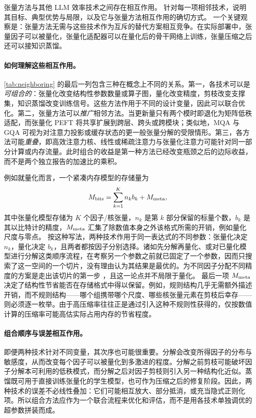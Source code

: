 \documentclass[11pt]{article}
\begin{document}
张量方法与其他 LLM 效率技术之间存在相互作用。 针对每一项相邻技术，说明其目标、典型优势与局限，以及它与张量方法相互作用的确切方式。
一个关键观察是：张量方法无需与这些技术作为互斥的替代方案相互竞争。在实际部署中，张量因子可以被量化，张量化适配器可以在量化后的骨干网络上训练，张量压缩之后还可以接知识蒸馏。

\paragraph{如何理解这些相互作用。}
\cref{tab:neighboring} 的最后一列包含三种在概念上不同的关系。第一，各技术可以是\emph{可组合的}：张量化改变结构性参数数量或算子图，量化改变精度，剪枝改变支撑集，知识蒸馏改变训练信号。这些方法作用于不同的设计变量，因此可以联合优化。第二，张量方法可以\emph{推广}相邻方法。当更新量只有两个模时即退化为矩阵低秩适配，而张量化 PEFT 将共享扩展到跨层、跨头或跨模块；类似地，MQA 与 GQA 可视为对注意力投影或缓存状态的更一般张量分解的受限情形。第三，各方法可能\emph{重叠}，即高效注意力核、线性或稀疏注意力与张量化注意力可能针对同一部分计算或内存流量。此时组合的收益是第一种方法已经改变瓶颈之后的边际收益，而不是两个独立报告的加速比的乘积。

例如就量化而言，一个紧凑内存模型的存储量为
\begin{equation}
\label{eq:memory-budget}
M_{\rm bits} = \sum_{k=1}^{K} n_k b_k + M_{\rm meta},
\end{equation}
其中张量化模型存储为 $K$ 个因子/核张量，$n_k$ 是第 $k$ 部分保留的标量个数，$b_k$ 是其以比特计的精度，$M_{\rm meta}$ 汇集了除数值本身之外该格式所需的开销，例如量化尺度与零点。
按这种写法，两种技术作用于同一表达式的不同参数：张量化决定 $n_k$，量化决定 $b_k$，且两者都按因子分别选择。诸如先分解再量化、或对已量化模型进行分解这类顺序流程，在考察另一个参数之前就已固定了一个参数，因而只搜索了这一空间的一个切片，没有理由认为其结果是最优的。为不同因子分配不同精度的方案是走出该切片的第一步 \cite{liu2024decoquant}，且这一论点并不局限于量化。
最后一项 $M_{\rm meta}$ 决定了结构性节省能否在存储格式中得以保留。例如，规则结构几乎无需额外描述开销，而不规则结构——哪个组携带哪个尺度、哪些核张量元素在剪枝后幸存——则必须逐一枚举。由于高压缩率往往正是通过引入这种不规则性获得的，仅按数值计算的压缩率可能高估实际占用内存的节省程度。

\paragraph{组合顺序与误差相互作用。}
即便两种技术针对不同变量，其次序也可能很重要。分解会改变所得因子的分布与敏感度，从而改变每个因子可以被量化到多激进的程度。分解之前剪枝可能破坏因子分解本可利用的低秩模式，而分解之后对因子剪枝则引入另一种结构化近似。蒸馏既可用于直接训练张量化的学生模型，也可作为压缩之后的修复阶段。因此，两种技术的误差不必线性叠加：它们可能相互放大、部分抵消，或充当隐式正则化项。所以组合方法应作为一个联合流程来优化和评估，而不是用各技术单独调优的超参数拼装而成。
\end{document}
